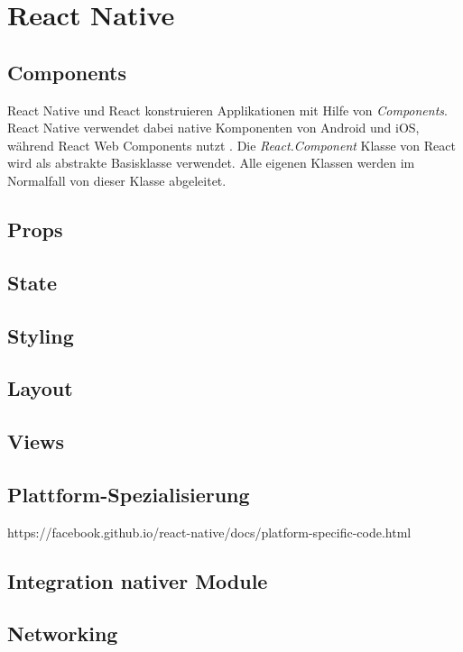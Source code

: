 \section{React Native}

\subsection{Components}
React Native und React konstruieren Applikationen mit Hilfe von \textit{Components}. React Native verwendet dabei native Komponenten von Android und iOS, während React Web Components nutzt  \cite{facebook_inc._start_2017}. Die \textit{React.Component} Klasse von React wird als abstrakte Basisklasse verwendet. Alle eigenen Klassen werden im Normalfall von dieser Klasse abgeleitet. 

\subsection{Props}

\subsection{State}

\subsection{Styling}

\subsection{Layout}

\subsection{Views}

\subsection{Plattform-Spezialisierung}
https://facebook.github.io/react-native/docs/platform-specific-code.html

\subsection{Integration nativer Module}

\subsection{Networking}
